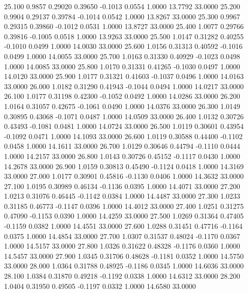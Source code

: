   25.100   0.9857   0.29020   0.39650  -0.1013   0.0554   1.0000  13.7792  33.0000
  25.200   0.9904   0.29137   0.39784  -0.1014   0.0542   1.0000  13.8267  33.0000
  25.300   0.9967   0.29315   0.39860  -0.1012   0.0531   1.0000  13.8727  33.0000
  25.400   1.0077   0.29766   0.39816  -0.1005   0.0518   1.0000  13.9263  33.0000
  25.500   1.0147   0.31282   0.40255  -0.1010   0.0499   1.0000  14.0030  33.0000
  25.600   1.0156   0.31313   0.40592  -0.1016   0.0499   1.0000  14.0055  33.0000
  25.700   1.0163   0.31330   0.40929  -0.1023   0.0498   1.0000  14.0085  33.0000
  25.800   1.0170   0.31331   0.41265  -0.1030   0.0497   1.0000  14.0120  33.0000
  25.900   1.0177   0.31321   0.41603  -0.1037   0.0496   1.0000  14.0163  33.0000
  26.000   1.0182   0.31290   0.41943  -0.1044   0.0494   1.0000  14.0217  33.0000
  26.100   1.0177   0.31198   0.42300  -0.1052   0.0492   1.0000  14.0286  33.0000
  26.200   1.0164   0.31057   0.42675  -0.1061   0.0490   1.0000  14.0376  33.0000
  26.300   1.0149   0.30895   0.43068  -0.1071   0.0487   1.0000  14.0509  33.0000
  26.400   1.0132   0.30726   0.43493  -0.1081   0.0481   1.0000  14.0724  33.0000
  26.500   1.0119   0.30601   0.43954  -0.1092   0.0471   1.0000  14.1093  33.0000
  26.600   1.0119   0.30588   0.44400  -0.1102   0.0458   1.0000  14.1611  33.0000
  26.700   1.0129   0.30646   0.44794  -0.1110   0.0444   1.0000  14.2157  33.0000
  26.800   1.0143   0.30726   0.45152  -0.1117   0.0430   1.0000  14.2678  33.0000
  26.900   1.0159   0.30813   0.45490  -0.1124   0.0418   1.0000  14.3169  33.0000
  27.000   1.0177   0.30901   0.45816  -0.1130   0.0406   1.0000  14.3632  33.0000
  27.100   1.0195   0.30989   0.46134  -0.1136   0.0395   1.0000  14.4071  33.0000
  27.200   1.0213   0.31076   0.46445  -0.1142   0.0384   1.0000  14.4487  33.0000
  27.300   1.0233   0.31185   0.46773  -0.1147   0.0396   1.0000  14.4012  33.0000
  27.400   1.0251   0.31275   0.47090  -0.1153   0.0390   1.0000  14.4259  33.0000
  27.500   1.0269   0.31364   0.47405  -0.1159   0.0382   1.0000  14.4551  33.0000
  27.600   1.0288   0.31451   0.47716  -0.1164   0.0375   1.0000  14.4854  33.0000
  27.700   1.0307   0.31537   0.48024  -0.1170   0.0367   1.0000  14.5157  33.0000
  27.800   1.0326   0.31622   0.48328  -0.1176   0.0360   1.0000  14.5457  33.0000
  27.900   1.0345   0.31706   0.48628  -0.1181   0.0352   1.0000  14.5750  33.0000
  28.000   1.0364   0.31788   0.48925  -0.1186   0.0345   1.0000  14.6036  33.0000
  28.100   1.0384   0.31870   0.49218  -0.1192   0.0338   1.0000  14.6312  33.0000
  28.200   1.0404   0.31950   0.49505  -0.1197   0.0332   1.0000  14.6580  33.0000
